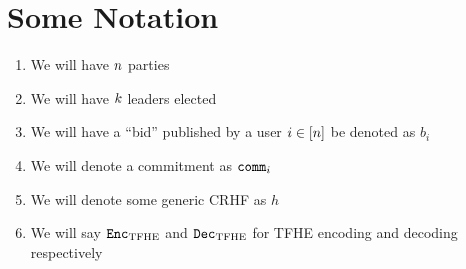 \documentclass[11pt]{article}
\begin{document}
\section{Some Notation}
\begin{enumerate}
	\item We will have $n$ parties
	\item We will have $k$ leaders elected
	\item We will have a ``bid'' published by a user $i \in [n]$ be denoted as $b_i$
	\item We will denote a commitment as $\texttt{comm}_i$
	\item We will denote some generic CRHF as $h$
	\item We will say $\texttt{Enc}_{\mathrm{TFHE}}$ and $\texttt{Dec}_{\mathrm{TFHE}}$ for TFHE encoding and decoding respectively
\end{enumerate}


\end{document}
